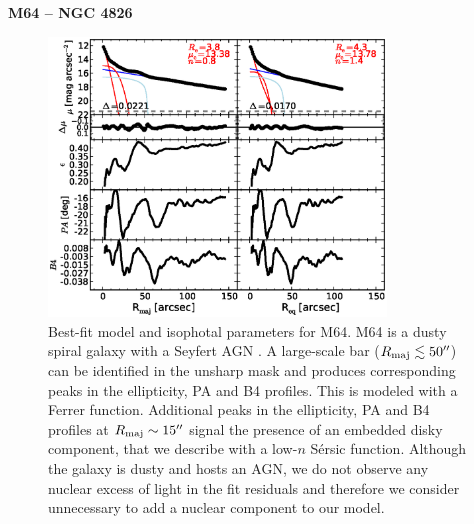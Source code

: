 \documentclass[preprint2]{emulateapj}
\newcommand{\fitfigurewidth}{0.8\textwidth}
\begin{document}
  \clearpage\newpage\noindent
  {\bf M64 -- NGC 4826 \\}
  
  \begin{figure}[h]
  \begin{center}
  \includegraphics[width=\fitfigurewidth]{images/m64_1Dfit.eps}
  \caption{Best-fit model and isophotal parameters for M64.
  M64 is a dusty spiral galaxy with a Seyfert AGN \citep{veroncettyveron2006}. 
  A large-scale bar ($R_{\rm maj} \lesssim 50''$) can be identified in the unsharp mask 
  and produces corresponding peaks in the ellipticity, PA and B4 profiles.
  This is modeled with a Ferrer function.
  Additional peaks in the ellipticity, PA and B4 profiles at $R_{\rm maj} \sim 15''$ 
  signal the presence of an embedded disky component, that we describe with a low-$n$ S\'ersic function.
  Although the galaxy is dusty and hosts an AGN, we do not observe any nuclear excess of light 
  in the fit residuals and therefore we consider unnecessary to add a nuclear component to our model. 
  }
  \end{center}
  \end{figure}
\end{document}
